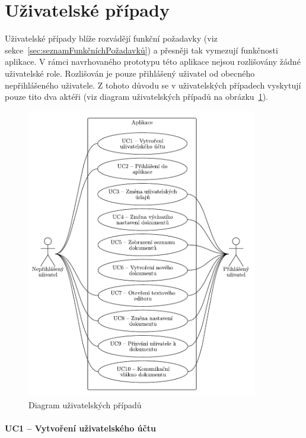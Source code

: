 \section{Uživatelské případy}\label{sec:uzivatelskePripady}

Uživatelské případy blíže rozvádějí funkční požadavky (viz sekce~\ref{sec:seznamFunkčníchPožadavků}) a přesněji tak vymezují funkčnosti aplikace.
V rámci navrhovaného prototypu této aplikace nejsou rozlišovány žádné uživatelské role.
Rozlišován je pouze přihlášený uživatel od obecného nepřihlášeného uživatele.
Z tohoto důvodu se v uživatelských případech vyskytují pouze tito dva aktéři (viz diagram uživatelských případů na obrázku~\ref{fig:useCases}).

\begin{figure}[ht!]
    \centering
    \includegraphics[width=0.9\textwidth]{partials/analyza/useCases.pdf}
    \caption{Diagram uživatelských případů}\label{fig:useCases}
\end{figure}


\paragraph{UC1 -- Vytvoření uživatelského účtu}


